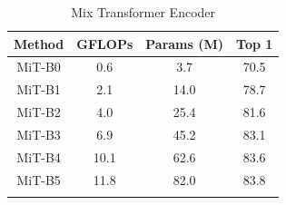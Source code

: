 \begin{table}[]
\centering
\begin{tabular}{c|c|c|c}
\whline
Method & GFLOPs & Params (M) & Top 1 \\ \hline
MiT-B0 & 0.6 & 3.7 & 70.5 \\ %
MiT-B1 & 2.1 & 14.0 & 78.7 \\ %
MiT-B2 & 4.0 & 25.4 & 81.6 \\ %
MiT-B3 & 6.9 & 45.2 & 83.1 \\ %
MiT-B4 & 10.1 & 62.6 & 83.6  \\ %
MiT-B5 & 11.8 & 82.0 & 83.8 \\ 
\whline
\end{tabular}
\caption{Mix Transformer Encoder}
\label{tab:imagenet}
\end{table}